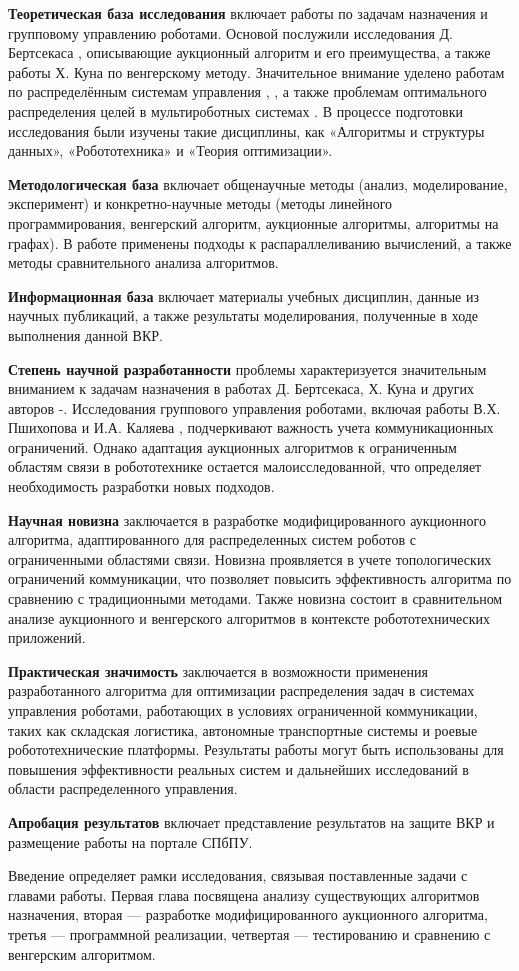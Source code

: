 \textbf{Теоретическая база исследования} включает работы по задачам назначения и групповому управлению роботами. Основой послужили исследования Д. Бертсекаса \cite{bertsekas1990}, описывающие аукционный алгоритм и его преимущества, а также работы Х. Куна \cite{kuhn1955} по венгерскому методу. Значительное внимание уделено работам по распределённым системам управления \cite{pshikhopov2015},  \cite{kalyaev2009}, а также проблемам оптимального распределения целей в мультироботных системах \cite{gerkey2003}. В процессе подготовки исследования были изучены такие дисциплины, как «Алгоритмы и структуры данных», «Робототехника» и «Теория оптимизации».

\textbf{Методологическая база} включает общенаучные методы (анализ, моделирование, эксперимент) и конкретно-научные методы (методы линейного программирования, венгерский алгоритм, аукционные алгоритмы, алгоритмы на графах). В работе применены подходы к распараллеливанию
 вычислений, а также методы сравнительного анализа алгоритмов.

\textbf{Информационная база} включает материалы учебных дисциплин, данные из научных публикаций, а также результаты моделирования, полученные в ходе выполнения данной ВКР.

\textbf{Степень научной разработанности} проблемы характеризуется значительным вниманием к задачам назначения в работах Д. Бертсекаса, Х. Куна и других авторов \cite{bertsekas1990}-\cite{gerkey2003}. Исследования группового управления роботами, включая работы В.Х. Пшихопова \cite{pshikhopov2015} и И.А. Каляева \cite{kalyaev2009}, подчеркивают важность учета коммуникационных ограничений. Однако адаптация аукционных алгоритмов к ограниченным областям связи в робототехнике остается малоисследованной, что определяет необходимость разработки новых подходов.

\textbf{Научная новизна} заключается в разработке модифицированного аукционного алгоритма, адаптированного для распределенных систем роботов с ограниченными областями связи. Новизна проявляется в учете топологических ограничений коммуникации, что позволяет повысить эффективность алгоритма по сравнению с традиционными методами. Также новизна состоит в сравнительном анализе аукционного и венгерского алгоритмов в контексте робототехнических приложений.

\textbf{Практическая значимость} заключается в возможности применения разработанного алгоритма для оптимизации распределения задач в системах управления роботами, работающих в условиях ограниченной коммуникации, таких как складская логистика, автономные транспортные системы и роевые робототехнические платформы. Результаты работы могут быть использованы для повышения эффективности реальных систем и дальнейших исследований в области распределенного управления.

\textbf{Апробация результатов} включает представление результатов на защите ВКР и размещение работы на портале СПбПУ.

Введение определяет рамки исследования, связывая поставленные задачи с главами работы. Первая глава посвящена анализу существующих алгоритмов назначения, вторая — разработке модифицированного аукционного алгоритма, третья — программной реализации, четвертая — тестированию и сравнению с венгерским алгоритмом.
